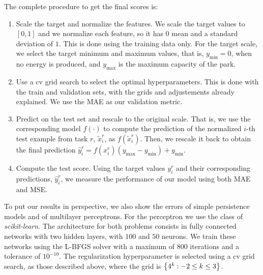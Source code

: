 %
The complete procedure to get the final scores is:
\begin{enumerate}
    \item {Scale the target and normalize the features.} We scale the target values to $[0, 1]$ and we normalize each feature, so it has $0$ mean and a standard deviation of $1$. This is done using the training data only. 
    For the target scale, we select the target minimum and maximum values, that is, $y_\text{min} = 0$, when no energy is produced, and $y_\text{max}$ is the maximum capacity of the park.    
    \item {Use a \acrshort{cv} grid search to select the optimal hyperparameters.} This is done with the train and validation sets, with the grids and adjustements already explained. We use the MAE as our validation metric.
    \item {Predict on the test set and rescale to the original scale.} That is, we use the corresponding model $f(\cdot)$ to compute the prediction of the normalized $i$-th test example from task $r$, $\tilde{x}_i^r$, as $f(\tilde{x}_i^r)$. Then, we rescale it back to obtain the final prediction $\hat{y}_i^r = f(x_i^r)  (y_\text{max} - y_\text{min} ) + y_\text{min}$.
    \item {Compute the test score.} Using the target values $y_i^r$ and their corresponding predictions, $\hat{y}_i^r$, we measure the performance of our model using both MAE and MSE.
\end{enumerate}
%
%
To put our results in perspective, we also show the errors of simple persistence models and of multilayer perceptrons. For the perceptron we use the  class of \emph{scikit-learn}. The architecture for both problems consists in fully connected networks with two hidden layers, with $100$ and $50$ neurons. We train these networks using the L-BFGS solver with a maximum of $800$ iterations and a tolerance of $10^{-10}$. The regularization hyperparameter is selected using a \acrshort{cv} grid search, as those described above, where the grid is $\left\{4^k: -2 \leq k \leq 3\right\}$.






